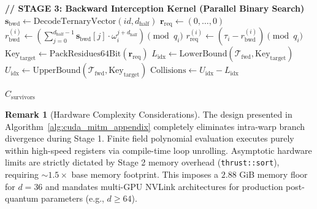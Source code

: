 \documentclass[11pt,a4paper]{article}
\theoremstyle{plain}
\theoremstyle{definition}
\newtheorem{observacion}[teorema]{Remark}
\numberwithin{equation}{section}
\newcommand{\cT}{\mathcal{T}}
\begin{document}
\begin{algorithm}[H]
\begin{algorithmic}[1]
\Statex \textbf{\color{blue} // STAGE 3: Backward Interception Kernel (Parallel Binary Search)}
    \State $\bm{s}_{\text{bwd}} \gets \text{DecodeTernaryVector}(id, d_{\text{half}})$
    \State $\bm{r}_{\text{req}} \gets (0, \dots, 0)$
        \State $r_{\text{bwd}}^{(i)} \gets \left( \sum_{j=0}^{d_{\text{half}}-1} \bm{s}_{\text{bwd}}[j] \cdot \omega_i^{j + d_{\text{half}}} \right) \pmod{q_i}$
        \State $r_{\text{req}}^{(i)} \gets \left( \tau_i - r_{\text{bwd}}^{(i)} \right) \pmod{q_i}$
    \EndFor
    \State $\text{Key}_{\text{target}} \gets \text{PackResidues64Bit}(\bm{r}_{\text{req}})$
    \State $L_{\text{idx}} \gets \text{LowerBound}(\cT_{\text{fwd}}, \text{Key}_{\text{target}})$
    \State $U_{\text{idx}} \gets \text{UpperBound}(\cT_{\text{fwd}}, \text{Key}_{\text{target}})$
    \State $\text{Collisions} \gets U_{\text{idx}} - L_{\text{idx}}$
        \State {}
    \EndIf
\EndFor
\State {}
\vspace{6pt}

\State \Return $C_{\text{survivors}}$
\end{algorithmic}
\end{algorithm}

\begin{observacion}[Hardware Complexity Considerations]
\label{obs:complejidad_hardware}
The design presented in Algorithm~\ref{alg:cuda_mitm_appendix} completely eliminates intra-warp branch divergence during Stage 1. Finite field polynomial evaluation executes purely within high-speed registers via compile-time loop unrolling. Asymptotic hardware limits are strictly dictated by Stage 2 memory overhead (\texttt{thrust::sort}), requiring $\sim 1.5\times$ base memory footprint. This imposes a $2.88$ GiB memory floor for $d=36$ and mandates multi-GPU NVLink architectures for production post-quantum parameters (e.g., $d \ge 64$).
\end{observacion}
\end{document}
